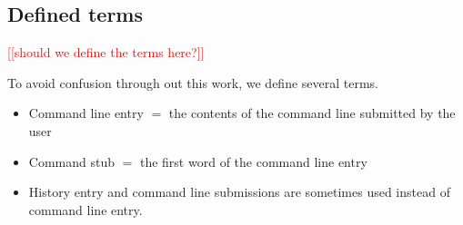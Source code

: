 \documentclass[thesis=M,english]{FITthesis}[2012/10/20]
\newcommand{\redtext}[1]{\textcolor{red}{[[#1]]}}
\begin{document}
\begin{introduction}
\section*{Defined terms}

\redtext{should we define the terms here?}

To avoid confusion through out this work, we define several terms.

\begin{itemize}
    \item Command line entry $=$ the contents of the command line submitted by the user
    \item Command stub $=$ the first word of the command line entry
    \item History entry and command line submissions are sometimes used instead of command line entry.
\end{itemize}

\end{introduction}









\end{document}
